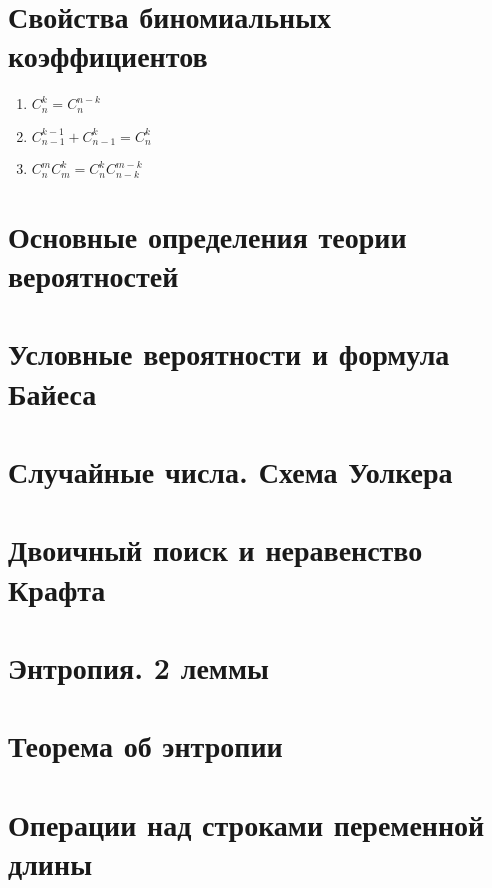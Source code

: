 \documentclass[12pt, fleqn]{article}
\begin{document}
\section{Свойства биномиальных коэффициентов}
\begin{enumerate}
  \item $C_n^k = C_n^{n-k}$
  \item $C^{k-1}_{n-1} + C^k_{n-1} = C^k_n$
  \item $C^m_n C^k_m = C^k_n C^{m-k}_{n-k}$
\end{enumerate}

\section{Основные определения теории вероятностей}


\section{Условные вероятности и формула Байеса}






\section{Случайные числа. Схема Уолкера}


\section{Двоичный поиск и неравенство Крафта}


\section{Энтропия. 2 леммы}


\section{Теорема об энтропии}


\section{Операции над строками переменной длины}
\end{document}

